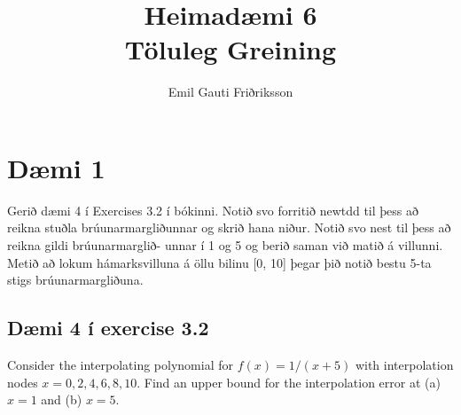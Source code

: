 \documentclass[11pt]{article}
\title{Heimadæmi 6\\ \vspace{0.4cm} \large Töluleg Greining}
\author{Emil Gauti Friðriksson}
\begin{document}
\maketitle
\section*{Dæmi 1}
Gerið dæmi 4 í Exercises 3.2 í bókinni. Notið svo forritið newtdd til þess að reikna stuðla
brúunarmargliðunnar og skrið hana niður. Notið svo nest til þess að reikna gildi brúunarmarglið-
unnar í 1 og 5 og berið saman við matið á villunni. Metið að lokum hámarksvilluna á öllu bilinu
[0, 10] þegar þið notið bestu 5-ta stigs brúunarmargliðuna.
\subsection*{Dæmi 4 í exercise 3.2}
Consider the interpolating polynomial for $f (x) = 1/(x + 5)$ with interpolation nodes
$x = 0,2,4,6,8, 10$. Find an upper bound for the interpolation error at (a) $x = 1$ and
(b) $x = 5$.
\end{document}
